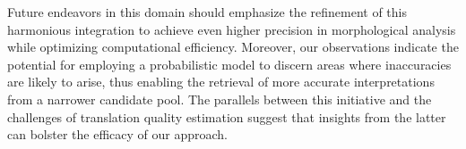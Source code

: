 \documentclass[AMS,STIX2COL]{WileyNJD-v2}
\begin{document}
    Future endeavors in this domain should emphasize the refinement of this harmonious integration to achieve even higher precision in morphological analysis while optimizing computational efficiency. Moreover, our observations indicate the potential for employing a probabilistic model to discern areas where inaccuracies are likely to arise, thus enabling the retrieval of more accurate interpretations from a narrower candidate pool. The parallels between this initiative and the challenges of translation quality estimation suggest that insights from the latter can bolster the efficacy of our approach.


    
\end{document}
